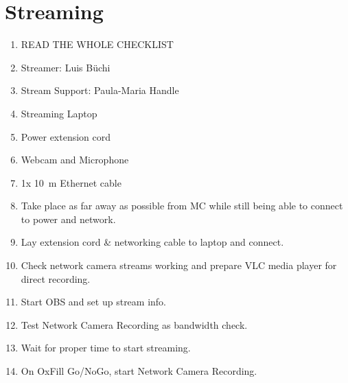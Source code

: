 \newpage
\setcounter{page}{1}
\lfoot{\thepage / \pageref{end_section_streaming}}
\section*{Streaming}


\begin{enumerate}[label=S\arabic*.]
    \item READ THE WHOLE CHECKLIST \checkbox
    
    \item Streamer: Luis Büchi
    \item Stream Support: Paula-Maria Handle
    \item Streaming Laptop\checkbox
    \item Power extension cord\checkbox
    \item Webcam and Microphone\checkbox
    \item 1x \SI{10}{\meter} Ethernet cable\checkbox
    
    \item Take place as far away as possible from MC while still being able to connect to power and network.\checkbox
    \item Lay extension cord \& networking cable to laptop and connect.\checkbox
    \item Check network camera streams working and prepare VLC media player for direct recording.\checkbox
    \item Start OBS and set up stream info.\checkbox
    \item Test Network Camera Recording as bandwidth check.\checkbox
    \item Wait for proper time to start streaming.\checkbox
    \item On OxFill Go/NoGo, start Network Camera Recording.\checkbox
    
    
    
\label{end_section_streaming}
\end{enumerate}